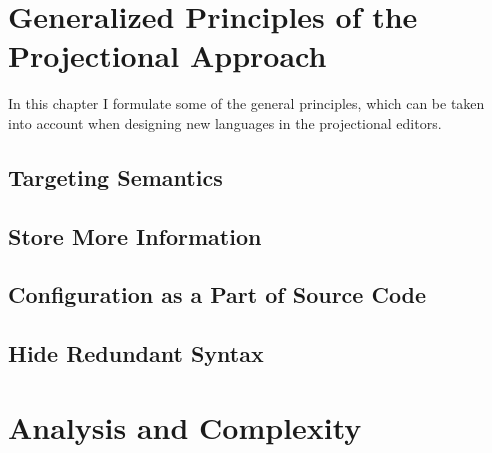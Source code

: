 \chapter{Generalized Principles of the Projectional Approach}

In this chapter I formulate some of the general principles, which can be taken into
account when designing new languages in the projectional editors.

\section{Targeting Semantics}

\section{Store More Information}


\section{Configuration as a Part of Source Code}

\section{Hide Redundant Syntax}



\chapter{Analysis and Complexity}


